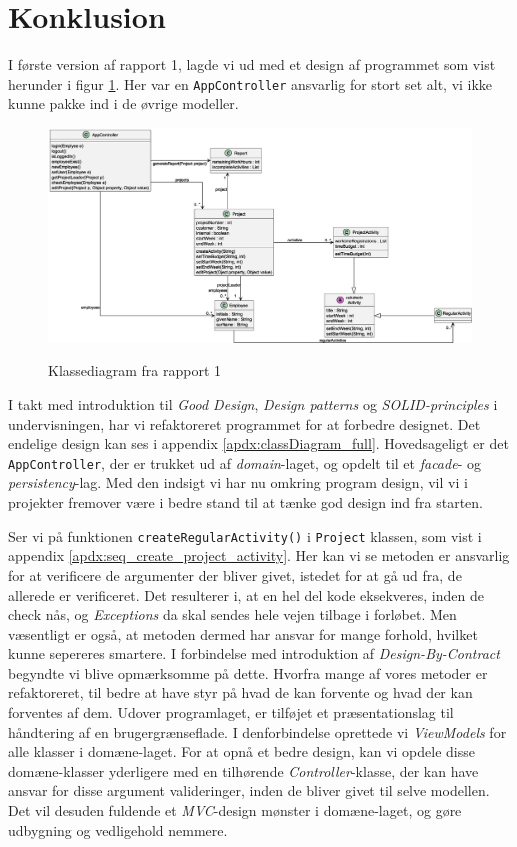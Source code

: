 \section{Konklusion} \label{chap:conclusion}
I første version af rapport 1, lagde vi ud med et design af programmet som vist herunder i figur \ref{fig:class_report1}. Her var en \texttt{AppController} ansvarlig for stort set alt, vi ikke kunne pakke ind i de øvrige modeller.
\begin{figure}[H]
    \centering
    \caption{Klassediagram fra rapport 1}
    \includegraphics[width = 12cm, keepaspectratio]{RequirementsAndDesign/Diagrams/ClassDiagram.eps}
    \label{fig:class_report1}
\end{figure}
I takt med introduktion til \textit{Good Design}, \textit{Design patterns} og \textit{SOLID-principles} i undervisningen, har vi refaktoreret programmet for at forbedre designet. Det endelige design kan ses i appendix \ref{apdx:classDiagram_full}. Hovedsageligt er det \texttt{AppController}, der er trukket ud af \textit{domain}-laget, og opdelt til et \textit{facade}- og \textit{persistency}-lag. Med den indsigt vi har nu omkring program design, vil vi i projekter fremover være i bedre stand til at tænke god design ind fra starten.

Ser vi på funktionen \texttt{createRegularActivity()} i \texttt{Project} klassen, som vist i appendix \ref{apdx:seq_create_project_activity}. Her kan vi se metoden er ansvarlig for at verificere de argumenter der bliver givet, istedet for at gå ud fra, de allerede er verificeret. Det resulterer i, at en hel del kode eksekveres, inden de check nås, og \textit{Exceptions} da skal sendes hele vejen tilbage i forløbet. Men væsentligt er også, at metoden dermed har ansvar for mange forhold, hvilket kunne sepereres smartere. I forbindelse med introduktion af \textit{Design-By-Contract} begyndte vi blive opmærksomme på dette. Hvorfra mange af vores metoder er refaktoreret, til bedre at have styr på hvad de kan forvente og hvad der kan forventes af dem. 
Udover programlaget, er tilføjet et præsentationslag til håndtering af en brugergrænseflade. I denforbindelse oprettede vi \textit{ViewModels} for alle klasser i domæne-laget. For at opnå et bedre design, kan vi opdele disse domæne-klasser yderligere med en tilhørende \textit{Controller}-klasse, der kan have ansvar for disse argument valideringer, inden de bliver givet til selve modellen. Det vil desuden fuldende et \textit{MVC}-design mønster i domæne-laget, og gøre udbygning og vedligehold nemmere.